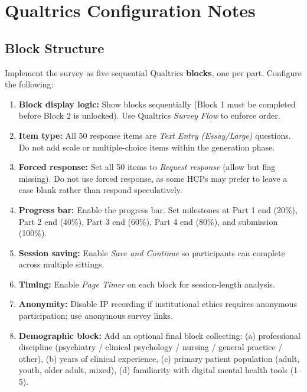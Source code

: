 \documentclass[11pt,a4paper]{article}
\begin{document}
\section{Qualtrics Configuration Notes}

\subsection*{Block Structure}

Implement the survey as five sequential Qualtrics \textbf{blocks}, one per part. Configure the following:

\begin{enumerate}
\item \textbf{Block display logic:} Show blocks sequentially (Block 1 must be completed before Block 2 is unlocked). Use Qualtrics \textit{Survey Flow} to enforce order.
\item \textbf{Item type:} All 50 response items are \textit{Text Entry (Essay/Large)} questions. Do not add scale or multiple-choice items within the generation phase.
\item \textbf{Forced response:} Set all 50 items to \textit{Request response} (allow but flag missing). Do not use forced response, as some HCPs may prefer to leave a case blank rather than respond speculatively.
\item \textbf{Progress bar:} Enable the progress bar. Set milestones at Part 1 end (20\%), Part 2 end (40\%), Part 3 end (60\%), Part 4 end (80\%), and submission (100\%).
\item \textbf{Session saving:} Enable \textit{Save and Continue} so participants can complete across multiple sittings.
\item \textbf{Timing:} Enable \textit{Page Timer} on each block for session-length analysis.
\item \textbf{Anonymity:} Disable IP recording if institutional ethics requires anonymous participation; use anonymous survey links.
\item \textbf{Demographic block:} Add an optional final block collecting: (a) professional discipline (psychiatry / clinical psychology / nursing / general practice / other), (b) years of clinical experience, (c) primary patient population (adult, youth, older adult, mixed), (d) familiarity with digital mental health tools (1--5).
\end{enumerate}
\end{document}
